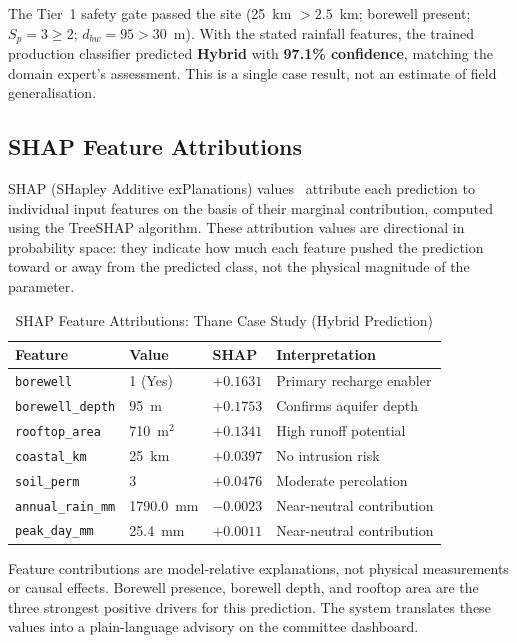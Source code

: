 ﻿\documentclass[conference]{IEEEtran}
\begin{document}
The Tier~1 safety gate passed the site (25~km $> 2.5$~km; borewell present; $S_p = 3 \ge 2$; $d_{bw} = 95 > 30$~m). With the stated rainfall features, the trained production classifier predicted \textbf{Hybrid} with \textbf{97.1\% confidence}, matching the domain expert's assessment. This is a single case result, not an estimate of field generalisation.

\subsection{SHAP Feature Attributions}

SHAP (SHapley Additive exPlanations) values~\cite{lundberg} attribute each prediction to individual input features on the basis of their marginal contribution, computed using the TreeSHAP algorithm. These attribution values are directional in probability space: they indicate how much each feature pushed the prediction toward or away from the predicted class, not the physical magnitude of the parameter.

\begin{table}[htbp]
\caption{SHAP Feature Attributions: Thane Case Study (Hybrid Prediction)}
\begin{center}
\begin{tabular}{llll}
\toprule
\textbf{Feature} & \textbf{Value} & \textbf{SHAP} & \textbf{Interpretation} \\
\midrule
\texttt{borewell}         & 1 (Yes)   & $+0.1631$ & Primary recharge enabler \\
\texttt{borewell\_depth}  & 95~m      & $+0.1753$ & Confirms aquifer depth   \\
\texttt{rooftop\_area}    & 710~m$^2$ & $+0.1341$ & High runoff potential    \\
\texttt{coastal\_km}      & 25~km     & $+0.0397$ & No intrusion risk        \\
\texttt{soil\_perm}       & 3         & $+0.0476$ & Moderate percolation     \\
\texttt{annual\_rain\_mm} & 1790.0~mm & $-0.0023$ & Near-neutral contribution \\
\texttt{peak\_day\_mm}    & 25.4~mm   & $+0.0011$ & Near-neutral contribution \\
\bottomrule
\end{tabular}
\label{tab:shap}
\end{center}
\end{table}

Feature contributions are model-relative explanations, not physical measurements or causal effects. Borewell presence, borewell depth, and rooftop area are the three strongest positive drivers for this prediction. The system translates these values into a plain-language advisory on the committee dashboard.
\end{document}
